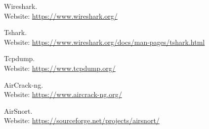 \documentclass[11pt]{article}
\begin{document}
\clearpage
\begin{thebibliography}{99}
	Wireshark. \\
	Website: \url{https://www.wireshark.org/}

	Tshark. \\
	Website: \url{https://www.wireshark.org/docs/man-pages/tshark.html}

	Tcpdump. \\
	Website: \url{https://www.tcpdump.org/}

	AirCrack-ng. \\
	Website: \url{https://www.aircrack-ng.org/}

	AirSnort. \\
	Website: \url{https://sourceforge.net/projects/airsnort/}
\end{thebibliography}
\end{document}
